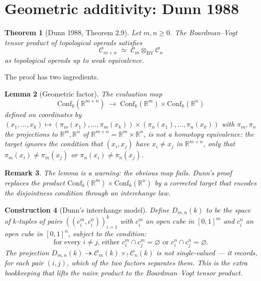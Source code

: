 \documentclass[11pt]{article}
\newtheorem{theorem}{Theorem}[section]
\newtheorem{lemma}[theorem]{Lemma}
\newtheorem{construction}[theorem]{Construction}
\newtheorem{remark}[theorem]{Remark}
\newcommand{\Cube}{\mathscr{C}}
\newcommand{\Conf}{\mathrm{Conf}}
\newcommand{\R}{\mathbb{R}}
\begin{document}
\section{Geometric additivity: Dunn 1988}
\label{sec:geometric-dunn}

\begin{theorem}[Dunn 1988, Theorem 2.9]
\label{thm:dunn-geometric}
Let $m, n \geq 0$. The Boardman--Vogt tensor product of topological
operads satisfies
\[
  \Cube_{m + n} \;\simeq\; \Cube_{m} \otimes_{\mathrm{BV}} \Cube_{n}
\]
as topological operads up to weak equivalence.
\end{theorem}

The proof has two ingredients.

\begin{lemma}[Geometric factor]
\label{lem:geometric-factor}
The evaluation map
\[
  \Conf_{k}(\R^{m+n}) \;\longrightarrow\; \Conf_{k}(\R^{m}) \times
  \Conf_{k}(\R^{n})
\]
defined on coordinates by $(x_{1}, \ldots, x_{k}) \mapsto
(\pi_{m}(x_{1}), \ldots, \pi_{m}(x_{k})) \times (\pi_{n}(x_{1}),
\ldots, \pi_{n}(x_{k}))$ with $\pi_{m}, \pi_{n}$ the projections to
$\R^{m}, \R^{n}$ of $\R^{m+n} = \R^{m} \times \R^{n}$, is not a
homotopy equivalence: the target ignores the condition that
$(x_{i}, x_{j})$ have $x_{i} \neq x_{j}$ in $\R^{m+n}$, only that
$\pi_{m}(x_{i}) \neq \pi_{m}(x_{j})$ or $\pi_{n}(x_{i}) \neq \pi_{n}(x_{j})$.
\end{lemma}

\begin{remark}
The lemma is a \emph{warning}: the obvious map fails. Dunn's proof
replaces the product $\Conf_{k}(\R^{m}) \times \Conf_{k}(\R^{n})$ by
a corrected target that encodes the disjointness condition through an
interchange law.
\end{remark}

\begin{construction}[Dunn's interchange model]
\label{constr:dunn-interchange}
Define $D_{m, n}(k)$ to be the space of $k$-tuples of pairs
$((c_{i}^{m}, c_{i}^{n}))_{i = 1}^{k}$ with $c_{i}^{m}$ an
open cube in $[0, 1]^{m}$ and $c_{i}^{n}$ an open cube in $[0, 1]^{n}$,
subject to the condition:
\[
  \text{for every $i \neq j$, either $c_{i}^{m} \cap c_{j}^{m} =
  \varnothing$ or $c_{i}^{n} \cap c_{j}^{n} = \varnothing$.}
\]
The projection $D_{m, n}(k) \twoheadrightarrow \Cube_{m}(k) \times_{?}
\Cube_{n}(k)$ is not single-valued --- it records, for each pair
$(i, j)$, \emph{which} of the two factors separates them. This is
the extra bookkeeping that lifts the naive product to the Boardman--Vogt
tensor product.
\end{construction}
\end{document}

